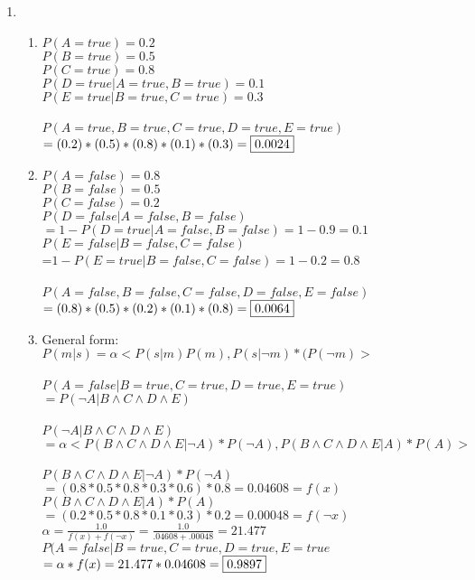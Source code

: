 \documentclass[12pt,a4paper]{report}
\begin{document}
\begin{enumerate}
\pagebreak
\item
\begin{enumerate}
	\item
	$P(A=true)=0.2$\\
	$P(B=true)=0.5$\\
	$P(C=true)=0.8$\\
	$P(D=true | A=true, B=true)=0.1$\\
	$P(E=true|B=true, C=true)=0.3$\\ \\
	$P(A=true,B=true,C=true,D=true,E=true)$\\$=(0.2)*(0.5)*(0.8)*(0.1)*(0.3) = \fbox{0.0024}$
	\item
	$P(A=false)=0.8$\\
	$P(B=false)=0.5$\\
	$P(C=false)=0.2$\\
	$P(D=false|A=false,B=false)$\\$=1-P(D=true|A=false,B=false)=1-0.9=0.1$\\
	$P(E=false|B=false,C=false)$\\=$1-P(E=true|B=false,C=false)=1-0.2=0.8$\\ \\
	$P(A=false, B=false, C=false, D=false, E=false)$\\ $=(0.8)*(0.5)*(0.2)*(0.1)*(0.8) = \fbox{0.0064}$
	\item
	General form: $P(m|s)=\alpha <P(s|m)P(m),P(s|\neg m)*(P(\neg m)>$\\ \\
	$P(A=false|B=true,C=true,D=true,E=true)$\\$=P(\neg A| B \wedge C \wedge D \wedge E)$\\ \\
	$P(\neg A| B \wedge C \wedge D \wedge E)$\\$=\alpha <P(B \wedge C \wedge D \wedge E|\neg A)*P(\neg A),P(B \wedge C \wedge D \wedge E|A)*P(A)>$\\ \\
	$P(B \wedge C \wedge D \wedge E|\neg A)*P(\neg A)$\\$ = (0.8*0.5*0.8*0.3*0.6)*0.8 = 0.04608 = f(x)$\\
	$P(B \wedge C \wedge D \wedge E|A)*P(A) $\\$= (0.2*0.5*0.8*0.1*0.3)*0.2 = 0.00048 = f(\neg x)$\\
	$\alpha = \frac{1.0}{f(x)+f(\neg x)}=\frac{1.0}{.04608+.00048} = 21.477$\\
	$P(A=false|B=true,C=true,D=true,E=true$\\$ = \alpha * f(x) = 21.477 * 0.04608=\fbox{0.9897}$


\end{enumerate}
\end{enumerate}
\end{document}
